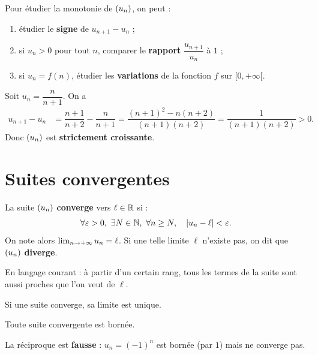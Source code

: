 \documentclass[12pt,a4paper]{article}
\begin{document}
\begin{methodebox}
Pour étudier la monotonie de $(u_n)$, on peut :
\begin{enumerate}
  \item étudier le \textbf{signe} de $u_{n+1}-u_n$ ;
  \item si $u_n > 0$ pour tout $n$, comparer le \textbf{rapport} $\dfrac{u_{n+1}}{u_n}$ à $1$ ;
  \item si $u_n = f(n)$, étudier les \textbf{variations} de la fonction $f$ sur $[0,+\infty[$.
\end{enumerate}
\end{methodebox}

\begin{exemplebox}[2.1]
Soit $u_n = \dfrac{n}{n+1}$. On a
\begin{align*}
u_{n+1}-u_n
&= \dfrac{n+1}{n+2} - \dfrac{n}{n+1}
= \dfrac{(n+1)^2 - n(n+2)}{(n+1)(n+2)}
= \dfrac{1}{(n+1)(n+2)} > 0.
\end{align*}
Donc $(u_n)$ est \textbf{strictement croissante}.
\end{exemplebox}

\section{Suites convergentes}

\begin{definitionbox}
La suite $(u_n)$ \textbf{converge} vers $\ell\in\mathbb{R}$ si :
\[
\forall \varepsilon > 0,\ \exists N\in\mathbb{N},\ \forall n\geq N,\quad \lvert u_n - \ell\rvert < \varepsilon.
\]
On note alors $\lim_{n\to +\infty} u_n = \ell$. Si une telle limite $\ell$ n'existe pas, on dit que $(u_n)$ \textbf{diverge}.
\end{definitionbox}

En langage courant : à partir d'un certain rang, tous les termes de la suite sont aussi proches que l'on veut de $\ell$.

\begin{propbox}
Si une suite converge, sa limite est unique.
\end{propbox}

\begin{propbox}
Toute suite convergente est bornée.

La réciproque est \textbf{fausse} : $u_n = (-1)^n$ est bornée (par $1$) mais ne converge pas.
\end{propbox}
\end{document}
